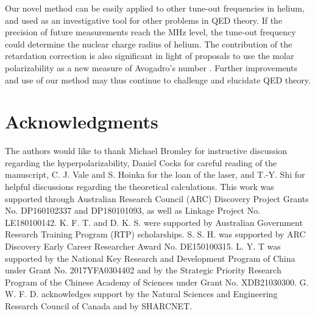 \documentclass[aps,prl,
reprint,
superscriptaddress,
 amsmath,amssymb,
floatfix
]{revtex4-2}
\begin{document}
Our novel method can be easily applied to other tune-out frequencies in helium, and used as an investigative tool for other problems in QED theory. If the precision of future measurements reach the MHz level, the tune-out frequency could determine the nuclear charge radius of helium. The contribution of the retardation correction is also significant in light of proposals to use the molar polarizability as a new measure of Avogadro's number \cite{Silvestri2018HeliumBasedRF}. Further improvements and use of our method may thus continue to challenge and elucidate QED theory.
 
\section{Acknowledgments}
\begin{acknowledgments}

The authors would like to thank Michael Bromley for instructive discussion regarding the hyperpolarizability, Daniel Cocks for careful reading of the manuscript, C. J. Vale and S. Hoinka for the loan of the laser, and T.-Y. Shi for helpful discussions regarding the theoretical calculations. This work was supported through Australian Research Council (ARC) Discovery Project Grants No. DP160102337 and DP180101093, as well as Linkage Project No. LE180100142. K. F. T. and D. K. S. were supported by Australian Government Research Training Program (RTP) scholarships. S. S. H. was supported by ARC Discovery Early Career Researcher Award No. DE150100315. L. Y. T was supported by the National Key Research and Development Program of China under Grant No. 2017YFA0304402 and by the Strategic Priority Research Program of the Chinese Academy of Sciences under Grant No. XDB21030300. G. W. F. D. acknowledges support by the Natural Sciences and Engineering Research Council of Canada and by SHARCNET.

\end{acknowledgments}
% 

\end{document}
